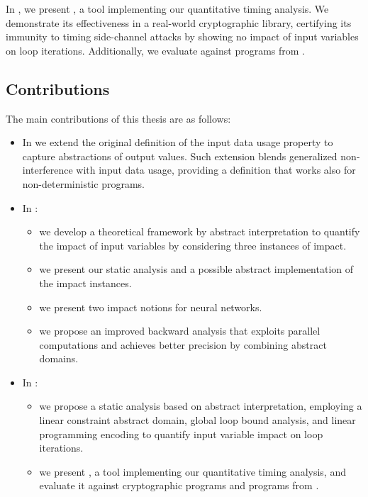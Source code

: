 In , we present \timesec, a tool implementing our quantitative timing analysis.
We demonstrate its effectiveness in a real-world cryptographic library, certifying its immunity to timing side-channel attacks by showing no impact of input variables on loop iterations.
Additionally, we evaluate \timesec{} against programs from \svcomp.

\subsection{Contributions}

The main contributions of this thesis are as follows:
\begin{itemize}
  \item In  we extend the original definition of the input data usage property to capture abstractions of output values.
  Such extension blends generalized non-interference with input data usage, providing a definition that works also for non-deterministic programs.
  \item In :
    \begin{itemize}
      \item we develop a theoretical framework by abstract interpretation to quantify the impact of input variables by considering three instances of impact.
      \item we present our static analysis and a possible abstract implementation of the impact instances.
      \item we present two impact notions for neural networks.
      \item we propose an improved backward analysis that exploits parallel computations and achieves better precision by combining abstract domains.
    \end{itemize}
  \item In :
    \begin{itemize}
      \item we propose a static analysis based on abstract interpretation, employing a linear constraint abstract domain, global loop bound analysis, and linear programming encoding to quantify input variable impact on loop iterations.
      \item we present \timesec, a tool implementing our quantitative timing analysis, and evaluate it against cryptographic programs and programs from \svcomp.
    \end{itemize}
\end{itemize}
